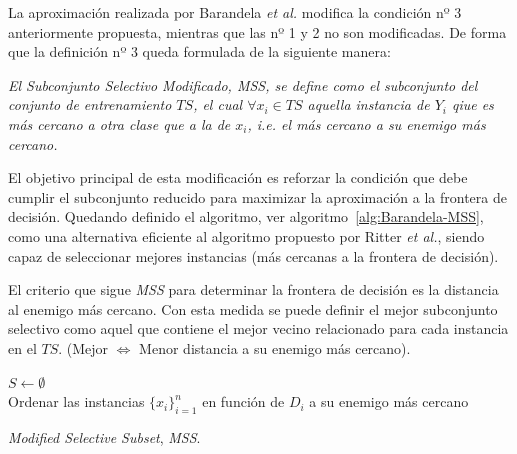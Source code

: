 La aproximación realizada por Barandela \textit{et al.} modifica la condición nº 3 anteriormente propuesta, mientras que las nº 1 y 2 no son modificadas. De forma que la definición nº 3 queda formulada de la siguiente manera:

\emph{El Subconjunto Selectivo Modificado, \textit{MSS}, se define como el subconjunto del conjunto de entrenamiento $TS$, el cual $\forall x_i \in TS$ aquella instancia de $Y_i$ qiue es más cercano a otra clase que a la de $x_i$, \textit{i.e.} el más cercano a su enemigo más cercano.}


El objetivo principal de esta modificación es reforzar la condición que debe cumplir el subconjunto reducido para maximizar la aproximación a la frontera de decisión. Quedando definido el algoritmo, ver algoritmo~\ref{alg:Barandela-MSS}, como una alternativa eficiente al algoritmo propuesto por Ritter \textit{et al.}, siendo capaz de seleccionar mejores instancias (más cercanas a la frontera de decisión). 

El criterio que sigue \textit{MSS} para determinar la frontera de decisión es la distancia al enemigo más cercano. Con esta medida se puede definir el mejor subconjunto selectivo como aquel que contiene el mejor vecino relacionado para cada instancia en el $TS$. (Mejor $\iff$ Menor distancia a su enemigo más cercano).

\begin{algorithm}[H]
  	\BlankLine
  $S \leftarrow \emptyset$\\  	
  Ordenar las instancias $\lbrace x_i \rbrace^{n}_{i=1}$ en función de $D_i$ a su enemigo más cercano\\
	\caption{\textit{Modified Selective Subset}, \textit{MSS}.}\label{alg:Barandela-MSS}
\end{algorithm}


